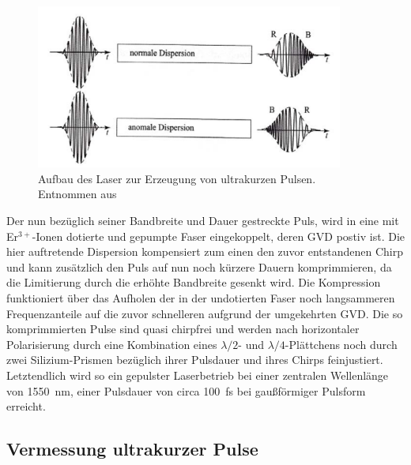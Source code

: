       \FloatBarrier
      \begin{figure}[h]
        \centering
        \includegraphics[width = 0.9\textwidth]{pictures/Dispersion.png}
        \caption{Aufbau des Laser zur Erzeugung von ultrakurzen Pulsen. Entnommen aus \cite{tu_dortmund_versuchsanleitung_nodate}}
        \label{fig:Dispersion}
      \end{figure}
      \FloatBarrier


      Der nun bezüglich seiner Bandbreite und Dauer gestreckte Puls, wird in eine mit Er$^{3+}$-Ionen dotierte und gepumpte Faser eingekoppelt, deren GVD postiv ist. Die hier auftretende Dispersion 
      kompensiert zum einen den zuvor entstandenen Chirp und kann zusätzlich den Puls auf nun noch kürzere Dauern komprimmieren, da die Limitierung durch die erhöhte Bandbreite gesenkt wird. Die
      Kompression funktioniert über das Aufholen der in der undotierten Faser noch langsammeren Frequenzanteile auf die zuvor schnelleren aufgrund der umgekehrten GVD. Die so komprimmierten Pulse sind 
      quasi chirpfrei und werden nach horizontaler Polarisierung durch eine Kombination eines $\lambda/2$- und $\lambda/4$-Plättchens noch durch zwei Silizium-Prismen bezüglich ihrer Pulsdauer und ihres 
      Chirps feinjustiert. Letztendlich wird so ein gepulster Laserbetrieb bei einer zentralen Wellenlänge von \SI{1550}{\nano\metre}, einer Pulsdauer von circa \SI{100}{\femto\second} bei gaußförmiger 
      Pulsform erreicht.
      
    
    \subsection{Vermessung ultrakurzer Pulse}
